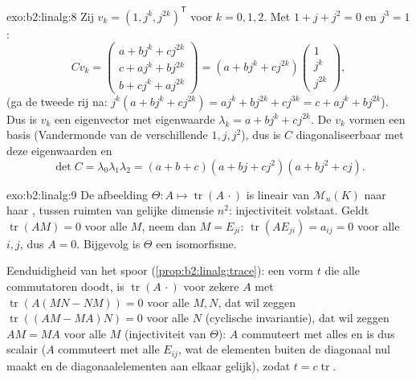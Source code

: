 \begin{solution}{exo:b2:linalg:8}
Zij $v_k = (1, j^k, j^{2k})^{\mathsf T}$ voor $k = 0, 1, 2$. Met $1
+ j + j^2 = 0$ en $j^3 = 1$:
\[
C v_k =
\begin{pmatrix}
a + b j^k + c j^{2k}\\
c + a j^k + b j^{2k}\\
b + c j^k + a j^{2k}
\end{pmatrix}
= (a + b j^k + c j^{2k})
\begin{pmatrix} 1\\ j^k\\ j^{2k}\end{pmatrix},
\]
(ga de tweede rij na: $j^k(a + bj^k + cj^{2k}) = aj^k + bj^{2k} +
cj^{3k} = c + aj^k + bj^{2k}$). Dus is $v_k$ een eigenvector met
eigenwaarde $\lambda_k = a + bj^k + cj^{2k}$. De $v_k$ vormen een
basis (Vandermonde van de verschillende $1, j, j^2$), dus is $C$
diagonaliseerbaar met deze eigenwaarden en
\[
\det C = \lambda_0\lambda_1\lambda_2
= (a+b+c)(a + bj + cj^2)(a + bj^2 + cj).
\]
\end{solution}

\begin{solution}{exo:b2:linalg:9}
De afbeelding $\Theta \colon A \mapsto \operatorname{tr}(A\,\cdot)$
is lineair van $\mathcal{M}_n(K)$ naar haar , tussen
ruimten van gelijke dimensie $n^2$: injectiviteit volstaat. Geldt
$\operatorname{tr}(AM) = 0$ voor alle $M$, neem dan $M = E_{ji}$:
$\operatorname{tr}(A E_{ji}) = a_{ij} = 0$ voor alle $i, j$, dus $A
= 0$. Bijgevolg is $\Theta$ een isomorfisme.

Eenduidigheid van het spoor (\cref{prop:b2:linalg:trace}): een vorm
$t$ die alle commutatoren doodt, is $\operatorname{tr}(A\,\cdot)$
voor zekere $A$ met $\operatorname{tr}(A(MN - NM)) = 0$ voor alle
$M, N$, dat wil zeggen $\operatorname{tr}((AM - MA)N) = 0$ voor
alle $N$ (cyclische invariantie), dat wil zeggen $AM = MA$ voor
alle $M$ (injectiviteit van $\Theta$): $A$ commuteert met alles en
is dus scalair ($A$ commuteert met alle $E_{ij}$, wat de elementen
buiten de diagonaal nul maakt en de diagonaalelementen aan elkaar
gelijk), zodat $t = c \operatorname{tr}$.
\end{solution}

